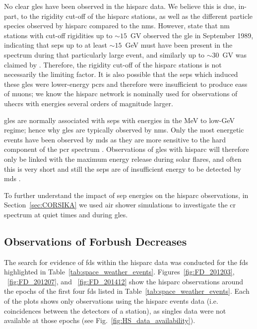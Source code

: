 No clear \glspl{gle} have been observed in the \gls{hisparc} data. We believe this is due, in-part, to the rigidity cut-off of the \gls{hisparc} stations, as well as the different particle species observed by \gls{hisparc} compared to the \glspl{nm}. However, \citet{humble_j._e._detection_2012} state that \gls{nm} stations with cut-off rigidities up to $\sim 15$~GV observed the \gls{gle} in September 1989, indicating that \glspl{sep} up to at least $\sim 15$~GeV must have been present in the spectrum during that particularly large event, and similarly up to $\sim 30$~GV was claimed by \citet{lovell_extended_1998}. Therefore, the rigidity cut-off of the \gls{hisparc} stations is not necessarily the limiting factor. It is also possible that the \glspl{sep} which induced these \glspl{gle} were lower-energy \glspl{pcr} and therefore were insufficient to produce \glspl{eas} of muons; we know the \gls{hisparc} network is nominally used for observations of \glspl{uhecr} with energies several orders of magnitude larger.

\glspl{gle} are normally associated with \glspl{sep} with energies in the MeV to low-GeV regime; hence why \glspl{gle} are typically observed by \glspl{nm}. Only the most energetic events have been observed by \glspl{md} as they are more sensitive to the hard component of the \gls{pcr} spectrum \citep{augusto_signals_2016}. Observations of \glspl{gle} with \gls{hisparc} will therefore only be linked with the maximum energy release during solar flares, and often this is very short and still the \glspl{sep} are of insufficient energy to be detected by \glspl{md} \citep{mccracken_high-energy_2012, augusto_signals_2016}. 

To further understand the impact of \gls{sep} energies on the \gls{hisparc} observations, in Section~\ref{sec:CORSIKA} we used air shower simulations to investigate the \gls{cr} spectrum at quiet times and during \glspl{gle}. %


\subsection{Observations of Forbush Decreases}


The search for evidence of \glspl{fd} within the \gls{hisparc} data was conducted for the \glspl{fd} highlighted in Table~\ref{tab:space_weather_events}. Figures~\ref{fig:FD_201203}, ~\ref{fig:FD_201207}, and ~\ref{fig:FD_201412} show the \gls{hisparc} observations around the epochs of the first four \glspl{fd} listed in Table~\ref{tab:space_weather_events}. Each of the plots shows only observations using the \gls{hisparc} events data (i.e. coincidences between the detectors of a station), as singles data were not available at those epochs (see Fig.~\ref{fig:HS_data_availability}).

